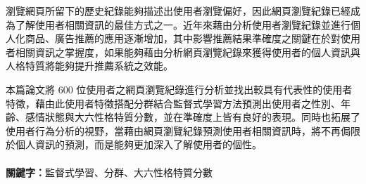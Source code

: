 \begin{abstractcn}

瀏覽網頁所留下的歷史紀錄能夠描述出使用者瀏覽偏好，因此網頁瀏覽紀錄已經成為了解使用者相關資訊的最佳方式之一。近年來藉由分析使用者瀏覽紀錄並進行個人化商品、廣告推薦的應用逐漸增加，其中影響推薦結果準確度之關鍵在於對使用者相關資訊之掌握度，如果能夠藉由分析網頁瀏覽紀錄來獲得使用者的個人資訊與人格特質將能夠提升推薦系統之效能。\par

本篇論文將 600 位使用者之網頁瀏覽紀錄進行分析並找出較具有代表性的使用者特徵，藉由此使用者特徵搭配分群結合監督式學習方法預測出使用者之性別、年齡、感情狀態與大六性格特質分數，並在準確度上皆有良好的表現。同時也拓展了使用者行為分析的視野，當藉由網頁瀏覽紀錄預測使用者相關資訊時，將不再侷限於個人資訊的預測，而是能夠更加深入了解使用者的個性。\\
 \\
{\bf 關鍵字：}監督式學習、分群、大六性格特質分數

\end{abstractcn} 